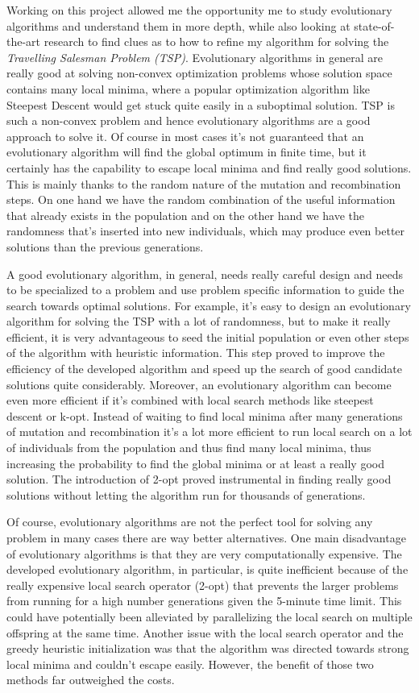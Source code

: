 \documentclass[a4paper,10pt]{article}
\begin{document}
Working on this project allowed me the opportunity me to study evolutionary algorithms and understand them in more depth, while also looking at state-of-the-art research to find clues as to how to refine my algorithm for solving the \textit{Travelling Salesman Problem (TSP)}. Evolutionary algorithms in general are really good at solving non-convex optimization problems whose solution space contains many local minima, where a popular optimization algorithm like Steepest Descent would get stuck quite easily in a suboptimal solution. TSP is such a non-convex problem and hence evolutionary algorithms are a good approach to solve it. Of course in most cases it's not guaranteed that an evolutionary algorithm will find the global optimum in finite time, but it certainly has the capability to escape local minima and find really good solutions. This is mainly thanks to the random nature of the mutation and recombination steps. On one hand we have the random combination of the useful information that already exists in the population and on the other hand we have the randomness that's inserted into new individuals, which may produce even better solutions than the previous generations.

A good evolutionary algorithm, in general, needs really careful design and needs to be specialized to a problem and use problem specific information to guide the search towards optimal solutions. For example, it's easy to design an evolutionary algorithm for solving the TSP with a lot of randomness, but to make it really efficient, it is very advantageous to seed the initial population or even other steps of the algorithm with heuristic information. This step proved to improve the efficiency of the developed algorithm and speed up the search of good candidate solutions quite considerably. Moreover, an evolutionary algorithm can become even more efficient if it's combined with local search methods like steepest descent or k-opt. Instead of waiting to find local minima after many generations of mutation and recombination it's a lot more efficient to run local search on a lot of individuals from the population and thus find many local minima, thus increasing the probability to find the global minima or at least a really good solution. The introduction of 2-opt proved instrumental in finding really good solutions without letting the algorithm run for thousands of generations.

Of course, evolutionary algorithms are not the perfect tool for solving any problem in many cases there are way better alternatives. One main disadvantage of evolutionary algorithms is that they are very computationally expensive. The developed evolutionary algorithm, in particular, is quite inefficient because of the really expensive local search operator (2-opt) that prevents the larger problems from running for a high number generations given the 5-minute time limit. This could have potentially been alleviated by parallelizing the local search on multiple offspring at the same time. Another issue with the local search operator and the greedy heuristic initialization was that the algorithm was directed towards strong local minima and couldn't escape easily. However, the benefit of those two methods far outweighed the costs.
\end{document}
